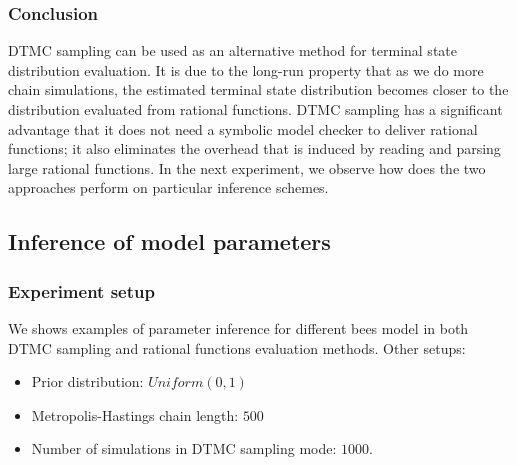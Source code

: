 \documentclass[12pt]{article}
\theoremstyle{definition}
\begin{document}
\subsubsection{Conclusion}
DTMC sampling can be used as an alternative method for terminal state
distribution evaluation. It is due to the long-run property that as we do more
chain simulations, the estimated terminal state distribution becomes closer to
the distribution evaluated from rational functions. DTMC sampling has a
significant advantage that it does not need a symbolic model checker to deliver
rational functions; it also eliminates the overhead that is induced by reading
and parsing large rational functions. In the next experiment, we observe how
does the two approaches perform on particular inference schemes.


\subsection{Inference of model parameters}
\subsubsection{Experiment setup}
We shows examples of parameter inference for different bees model in both DTMC
sampling and rational functions evaluation methods. Other setups:
\begin{itemize}
\item Prior distribution: $Uniform(0, 1)$
\item Metropolis-Hastings chain length: $500$
\item Number of simulations in DTMC sampling mode: $1000$.
\end{itemize}
\end{document}
